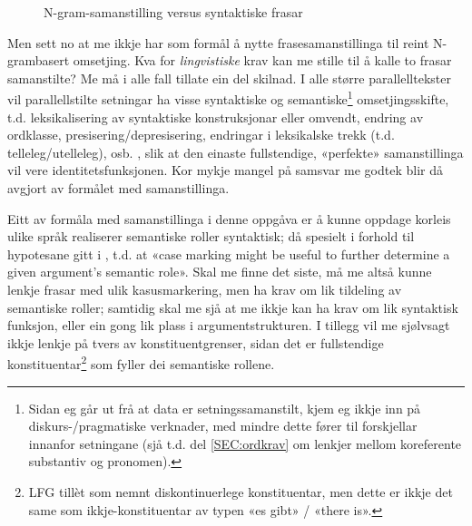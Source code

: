 \documentclass[12pt,a4paper,oneside,draft]{report}
\begin{document}
\begin{figure}[htp]
   \centering
   \caption{N-gram-samanstilling versus syntaktiske frasar}
    \label{fig:ikkjenode}
  \end{figure}

Men sett no at me ikkje har som formål å nytte frasesamanstillinga til
 reint N-grambasert omsetjing. Kva for \emph{lingvistiske} krav kan me
 stille til å kalle to frasar samanstilte? Me må i alle fall tillate
 ein del skilnad.  I alle større parallelltekster vil parallellstilte
 setningar ha visse syntaktiske og semantiske\footnote{Sidan eg går ut frå at data er setningssamanstilt, kjem eg
       ikkje inn på diskurs-/pragmatiske verknader, med mindre dette
       fører til forskjellar innanfor setningane (sjå t.d. del
       \ref{SEC:ordkrav} om lenkjer mellom koreferente substantiv og
       pronomen). } omsetjingsskifte,
 t.d. leksikalisering av syntaktiske konstruksjonar eller omvendt,
 endring av ordklasse, presisering/depresisering, endringar i
 leksikalske trekk (t.d. telleleg/utelleleg),
 osb. \citep[s.~56--62]{munday2001its}, slik at den einaste
 fullstendige, «perfekte» samanstillinga vil vere
 identitetsfunksjonen. Kor mykje mangel på samsvar me godtek blir då
 avgjort av formålet med samanstillinga.

Eitt av formåla med samanstillinga i denne oppgåva er å kunne oppdage
 korleis ulike språk realiserer semantiske roller syntaktisk; då
 spesielt i forhold til hypotesane gitt i \citet[s.~7]{xpar2008rcn},
 t.d. at «case marking might be useful to further determine a given
 argument's semantic role». Skal me finne det siste, må me altså kunne
 lenkje frasar med ulik kasusmarkering, men ha krav om lik tildeling
 av semantiske roller; samtidig skal me sjå at me ikkje kan ha krav om
 lik syntaktisk funksjon, eller ein gong lik plass i
 argumentstrukturen. I tillegg vil me sjølvsagt ikkje lenkje på tvers
 av konstituentgrenser, sidan det er fullstendige konstituentar\footnote{LFG tillèt som nemnt diskontinuerlege konstituentar, men dette
        er ikkje det same som ikkje-konstituentar av typen «es gibt» /
        «there is». }
 som fyller dei semantiske rollene.
\end{document}
